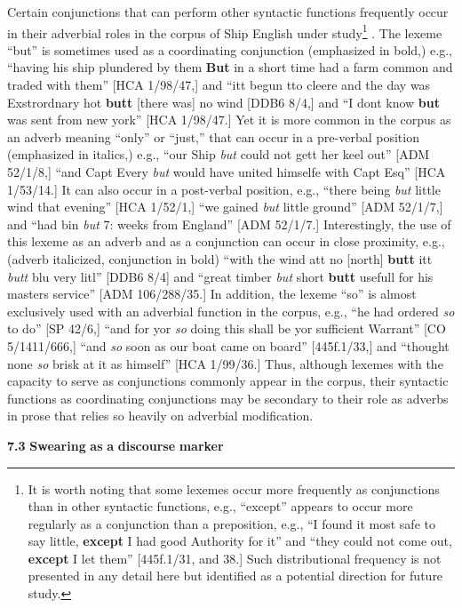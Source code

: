   Certain conjunctions that can perform other syntactic functions frequently occur in their adverbial roles in the corpus of Ship English under study\footnote{It is worth noting that some lexemes occur more frequently as conjunctions than in other syntactic functions, e.g., “except” appears to occur more regularly as a conjunction than a preposition, e.g., “I found it most safe to say little, \textbf{except} I had good Authority for it” and “they could not come out, \textbf{except} I let them” [445f.1/31, and 38.] Such distributional frequency is not presented in any detail here but identified as a potential direction for future study.} . The lexeme “but” is sometimes used as a coordinating conjunction (emphasized in bold,) e.g., “having his ship plundered by them \textbf{But} in a short time had a farm common and traded with them” [HCA 1/98/47,] and “itt begun tto cleere and the day was Exstrordnary hot \textbf{butt} [there was] no wind [DDB6 8/4,] and “I dont know \textbf{but} was sent from new york” [HCA 1/98/47.] Yet it is more common in the corpus as an adverb meaning “only” or “just,” that can occur in a pre-verbal position (emphasized in italics,) e.g., “our Ship \textit{but} could not gett her keel out” [ADM 52/1/8,] “and Capt Every \textit{but} would have united himselfe with Capt Esq” [HCA 1/53/14.] It can also occur in a post-verbal position, e.g., “there being \textit{but} little wind that evening” [HCA 1/52/1,] “we gained \textit{but} little ground” [ADM 52/1/7,] and “had bin \textit{but} 7: weeks from England” [ADM 52/1/7.] Interestingly, the use of this lexeme as an adverb and as a conjunction can occur in close proximity, e.g., (adverb italicized, conjunction in bold) “with the wind att no [north] \textbf{butt} itt \textit{butt} blu very litl” [DDB6 8/4] and “great timber \textit{but} short \textbf{butt} usefull for his masters service” [ADM 106/288/35.] In addition, the lexeme “so” is almost exclusively used with an adverbial function in the corpus, e.g., “he had ordered \textit{so} to do” [SP 42/6,] “and for yor \textit{so} doing this shall be yor sufficient Warrant” [CO 5/1411/666,] “and \textit{so} soon as our boat came on board” [445f.1/33,] and “thought none \textit{so} brisk at it as himself” [HCA 1/99/36.] Thus, although lexemes with the capacity to serve as conjunctions commonly appear in the corpus, their syntactic functions as coordinating conjunctions may be secondary to their role as adverbs in prose that relies so heavily on adverbial modification. 

\textbf{7.3} \textbf{Swearing} \textbf{as} \textbf{a} \textbf{discourse} \textbf{marker} 

